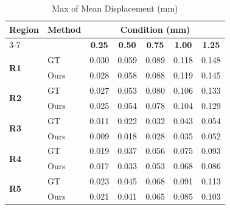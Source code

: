 \documentclass{article}
\begin{document}
\thispagestyle{empty}

\begin{table}[h]
\centering
\caption{Max of Mean Displacement (mm)}
\vspace{0.3cm}
\begin{tabular}{llccccc}
\toprule
\textbf{Region} & \textbf{Method} & \multicolumn{5}{c}{\textbf{Condition (mm)}} \\
\cmidrule(lr){3-7}
& & \textbf{0.25} & \textbf{0.50} & \textbf{0.75} & \textbf{1.00} & \textbf{1.25} \\
\midrule
\multirow{2}{*}{\textbf{R1}} & GT  & 0.030 & 0.059 & 0.089 & 0.118 & 0.148 \\
 & Ours  & 0.028 & 0.058 & 0.088 & 0.119 & 0.145 \\ \midrule
\multirow{2}{*}{\textbf{R2}} & GT  & 0.027 & 0.053 & 0.080 & 0.106 & 0.133 \\
 & Ours  & 0.025 & 0.054 & 0.078 & 0.104 & 0.129 \\ \midrule
\multirow{2}{*}{\textbf{R3}} & GT  & 0.011 & 0.022 & 0.032 & 0.043 & 0.054 \\
 & Ours  & 0.009 & 0.018 & 0.028 & 0.035 & 0.052 \\ \midrule
\multirow{2}{*}{\textbf{R4}} & GT  & 0.019 & 0.037 & 0.056 & 0.075 & 0.093 \\
 & Ours  & 0.017 & 0.033 & 0.053 & 0.068 & 0.086 \\ \midrule
\multirow{2}{*}{\textbf{R5}} & GT  & 0.023 & 0.045 & 0.068 & 0.091 & 0.113 \\
 & Ours  & 0.021 & 0.041 & 0.065 & 0.085 & 0.103 \\
\bottomrule
\end{tabular}
\end{table}
\end{document}
